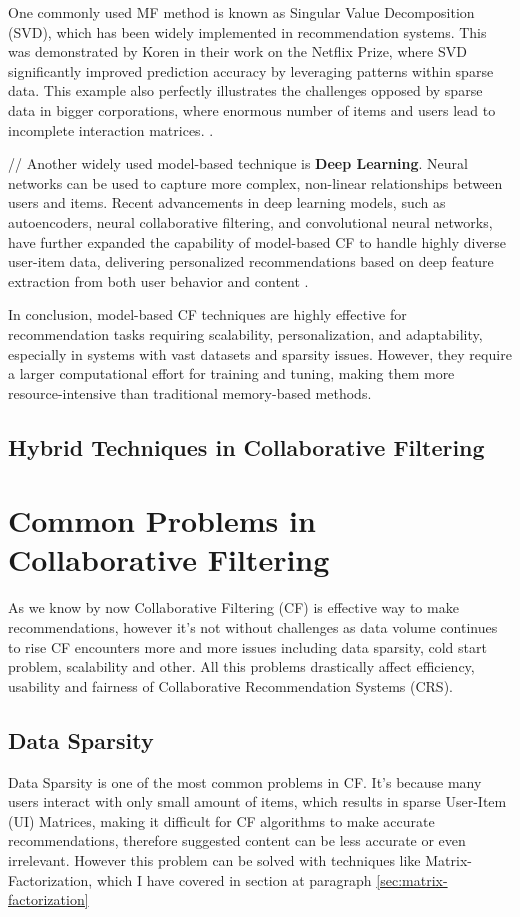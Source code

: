 \documentclass[10pt,a4paper]{article}
\begin{document}
\hspace{0.1cm}

One commonly used MF method is known as Singular Value Decomposition (SVD), which has been widely implemented in recommendation systems. This was demonstrated by Koren in their work on the Netflix Prize, where SVD significantly improved prediction accuracy by leveraging patterns within sparse data. This example also perfectly illustrates the challenges opposed by sparse data in bigger corporations, where enormous number of items and users lead to incomplete interaction matrices. \cite{koren2009bellkor}\cite{baker2005singular}.

\hspace{0.1cm}
//
Another widely used model-based technique is \textbf{Deep Learning}. Neural networks can be used to capture more complex, non-linear relationships between users and items. Recent advancements in deep learning models, such as autoencoders, neural collaborative filtering, and convolutional neural networks, have further expanded the capability of model-based CF to handle highly diverse user-item data, delivering personalized recommendations based on deep feature extraction from both user behavior and content \cite{he2017neural}.

In conclusion, model-based CF techniques are highly effective for recommendation tasks requiring scalability, personalization, and adaptability, especially in systems with vast datasets and sparsity issues. However, they require a larger computational effort for training and tuning, making them more resource-intensive than traditional memory-based methods.

\subsection{Hybrid Techniques in Collaborative Filtering} 

\section{Common Problems in Collaborative Filtering}
As we know by now Collaborative Filtering (CF) is effective way to make recommendations, however it's not without challenges as data volume continues to rise CF encounters more and more issues including data sparsity, cold start problem, scalability and other. All this problems drastically affect efficiency, usability and fairness of Collaborative Recommendation Systems (CRS). 

\subsection{Data Sparsity}
Data Sparsity is one of the most common problems in CF. It's because many users interact with only small amount of items, which results in  sparse User-Item (UI) Matrices, making it difficult for CF algorithms to make accurate recommendations, therefore suggested content can be less accurate or even irrelevant. However this problem can be solved with techniques like Matrix-Factorization, which I have covered in section at paragraph \ref{sec:matrix-factorization}
\end{document}
